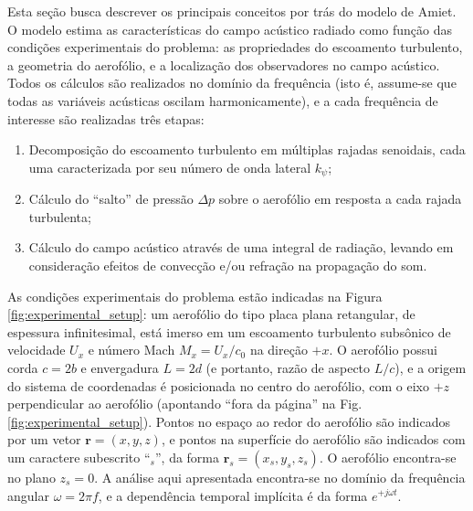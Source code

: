 \documentclass[a4paper, 11pt, twoside]{article}
\begin{document}
Esta seção busca descrever os principais conceitos por trás do modelo de Amiet. O modelo estima as características do campo acústico radiado como função das condições experimentais do problema: as propriedades do escoamento turbulento, a geometria do aerofólio, e a localização dos observadores no campo acústico. Todos os cálculos são realizados no domínio da frequência (isto é, assume-se que todas as variáveis acústicas oscilam harmonicamente), e a cada frequência de interesse são realizadas três etapas:

\begin{enumerate}
	\item Decomposição do escoamento turbulento em múltiplas rajadas senoidais, cada uma caracterizada por seu número de onda lateral $k_\psi$;
	\item Cálculo do ``salto'' de pressão $\Delta p$ sobre o aerofólio em resposta a cada rajada turbulenta;
	\item Cálculo do campo acústico através de uma integral de radiação, levando em consideração efeitos de convecção e/ou refração na propagação do som.
\end{enumerate}



As condições experimentais do problema estão indicadas na Figura \ref{fig:experimental_setup}: um aerofólio do tipo placa plana retangular, de espessura infinitesimal, está imerso em um escoamento turbulento subsônico de velocidade $U_x$ e número Mach $M_x = U_x/c_0$ na direção $+x$. O aerofólio possui corda $c=2b$ e envergadura $L=2d$ (e portanto, razão de aspecto $L/c$), e a origem do sistema de coordenadas é posicionada no centro do aerofólio, com o eixo $+z$ perpendicular ao aerofólio (apontando ``fora da página'' na Fig. \ref{fig:experimental_setup}). Pontos no espaço ao redor do aerofólio são indicados por um vetor $\mathbf{r}=(x, y, z)$, e pontos na superfície do aerofólio são indicados com um caractere subescrito ``$_s$'', da forma $\mathbf{r}_s = (x_s, y_s, z_s)$. O aerofólio encontra-se no plano $z_s = 0$. A análise aqui apresentada encontra-se no domínio da frequência angular $\omega = 2 \pi f$, e a dependência temporal implícita é da forma $e^{+j \omega t}$.
\end{document}
